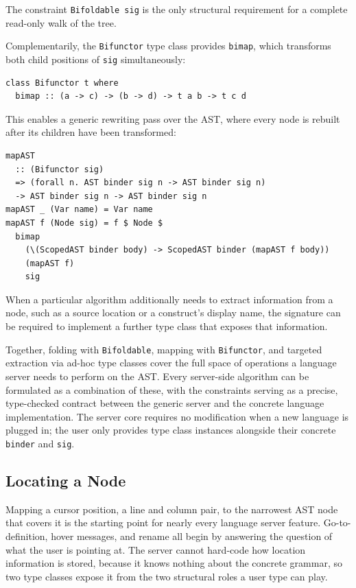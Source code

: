 The constraint \texttt{Bifoldable sig} is the only structural requirement for a complete read-only walk of the tree.

Complementarily, the \texttt{Bifunctor} type class provides \texttt{bimap}, which transforms both child positions of \texttt{sig} simultaneously:

\begin{verbatim}
class Bifunctor t where
  bimap :: (a -> c) -> (b -> d) -> t a b -> t c d
\end{verbatim}

This enables a generic rewriting pass over the AST, where every node is rebuilt after its children have been transformed:

\begin{verbatim}
mapAST
  :: (Bifunctor sig)
  => (forall n. AST binder sig n -> AST binder sig n)
  -> AST binder sig n -> AST binder sig n
mapAST _ (Var name) = Var name
mapAST f (Node sig) = f $ Node $
  bimap
    (\(ScopedAST binder body) -> ScopedAST binder (mapAST f body))
    (mapAST f)
    sig
\end{verbatim}

When a particular algorithm additionally needs to extract information from a node, such as a source location or a construct's display name, the signature can be required to implement a further type class that exposes that information.

Together, folding with \texttt{Bifoldable}, mapping with \texttt{Bifunctor}, and targeted extraction via ad-hoc type classes cover the full space of operations a language server needs to perform on the AST.
Every server-side algorithm can be formulated as a combination of these, with the constraints serving as a precise, type-checked contract between the generic server and the concrete language implementation.
The server core requires no modification when a new language is plugged in; the user only provides type class instances alongside their concrete \texttt{binder} and \texttt{sig}.

\subsection{Locating a Node}

Mapping a cursor position, a line and column pair, to the narrowest AST node that covers it is the starting point for nearly every language server feature.
Go-to-definition, hover messages, and rename all begin by answering the question of what the user is pointing at.
The server cannot hard-code how location information is stored, because it knows nothing about the concrete grammar, so two type classes expose it from the two structural roles a user type can play.

